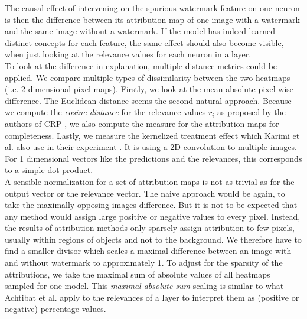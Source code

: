 The causal effect of intervening on the spurious watermark feature on one neuron is then the difference between its attribution map of one image with a watermark and the same image without a watermark. If the model has indeed learned distinct concepts for each feature, the same effect should also become visible, when just looking at the relevance values for each neuron in a layer.\\

To look at the difference in explanation, multiple distance metrics could be applied. We compare multiple types of dissimilarity between the two heatmaps (i.e. 2-dimensional pixel maps). Firstly, we look at the mean absolute pixel-wise difference. The Euclidean distance seems the second natural approach. Because we compute the \textit{cosine distance} for the relevance values $r_i$ as proposed by the authors of CRP \cite{Achtibat2023}, we also compute the measure for the attribution maps for completeness.
Lastly, we measure the kernelized treatment effect which Karimi et al. also use in their experiment \cite{Karimi2023}. It is using a 2D convolution to multiple images. For 1 dimensional vectors like the predictions and the relevances, this corresponds to a simple dot product.   \\ 

A sensible normalization for a set of attribution maps is not as trivial as for the output vector or the relevance vector. The naive approach would be again, to take the maximally opposing images difference. But it is not to be expected that any method would assign large positive or negative values to every pixel. Instead, the results of attribution methods only sparsely assign attribution to few pixels, usually within regions of objects and not to the background. 
We therefore have to find a smaller divisor which scales a maximal difference between an image with and without watermark to approximately 1.
To adjust for the sparsity of the attributions, we take the maximal sum of absolute values of all heatmaps sampled for one model. This \textit{maximal absolute sum} scaling is similar to what Achtibat et al. \cite{Achtibat2022} apply to the relevances of a layer to interpret them as (positive or negative) percentage values.\\


